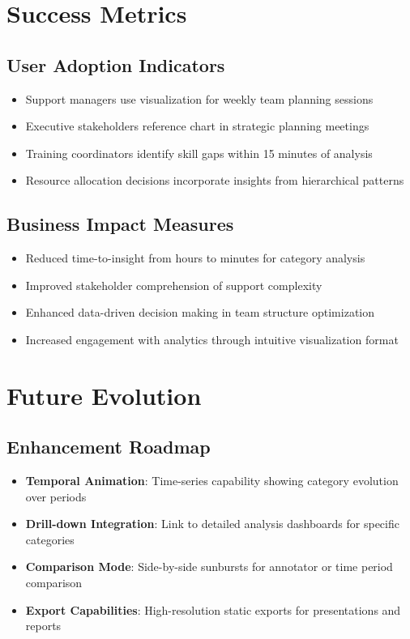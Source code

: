 \documentclass[11pt]{article}
\begin{document}
\section{Success Metrics}

\subsection{User Adoption Indicators}
\begin{itemize}
\item Support managers use visualization for weekly team planning sessions
\item Executive stakeholders reference chart in strategic planning meetings
\item Training coordinators identify skill gaps within 15 minutes of analysis
\item Resource allocation decisions incorporate insights from hierarchical patterns
\end{itemize}

\subsection{Business Impact Measures}
\begin{itemize}
\item Reduced time-to-insight from hours to minutes for category analysis
\item Improved stakeholder comprehension of support complexity
\item Enhanced data-driven decision making in team structure optimization
\item Increased engagement with analytics through intuitive visualization format
\end{itemize}

\section{Future Evolution}

\subsection{Enhancement Roadmap}
\begin{itemize}
\item \textbf{Temporal Animation}: Time-series capability showing category evolution over periods
\item \textbf{Drill-down Integration}: Link to detailed analysis dashboards for specific categories
\item \textbf{Comparison Mode}: Side-by-side sunbursts for annotator or time period comparison
\item \textbf{Export Capabilities}: High-resolution static exports for presentations and reports
\end{itemize}
\end{document}

